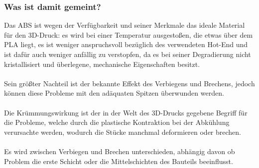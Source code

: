 \documentclass[11pt,a4paper]{article}
\begin{document}
		\subsubsection{Was ist damit gemeint?}Das ABS ist wegen der Verfügbarkeit und seiner Merkmale das ideale Material für den 3D-Druck: es wird bei einer Temperatur ausgestoßen, die etwas über dem PLA liegt, es ist weniger anspruchsvoll bezüglich des verwendeten Hot-End und ist dafür auch weniger anfällig zu verstopfen, da es bei seiner Degradierung nicht kristallisiert und überlegene, mechanische Eigenschaften besitzt.
\\\\
Sein größter Nachteil ist der bekannte Effekt des Verbiegens und Brechens, jedoch können diese Probleme mit den adäquaten Spitzen überwunden werden.
\\\\
Die Krümmungswirkung ist der in der Welt des 3D-Drucks gegebene Begriff für die Probleme, welche durch die plastische Kontraktion bei der Abkühlung verursachte werden, wodurch die Stücke manchmal deformieren oder brechen.
\\\\
Es wird zwischen Verbiegen und Brechen unterschieden, abhängig davon ob Problem die erste Schicht oder die Mittelschichten des Bauteils beeinflusst.
\end{document}
